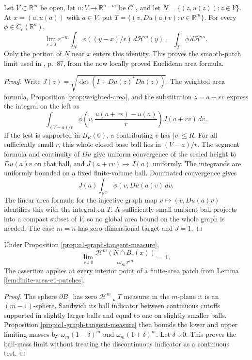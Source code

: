 \begin{proposition}\label{prop:c1-graph-tangent-measure}
Let $V\subset\mathbb R^m$ be open, let $u:V\to\mathbb R^{n-m}$ be $C^1$, and let $N=\{(z,u(z)):z\in V\}$. At $x=(a,u(a))$ with $a\in V$, put $T=\{(v,Du(a)v):v\in\mathbb R^m\}$. For every $\phi\in C_c(\mathbb R^n)$,
\[
 \lim_{r\downarrow0}r^{-m}\int_N\phi((y-x)/r)\,d\mathcal H^m(y)
 =\int_T\phi\,d\mathcal H^m.
\]
Only the portion of $N$ near $x$ enters this identity. This proves the smooth-patch limit used in \cite{Sim18}, p.~87, from the now locally proved Euclidean area formula.
\end{proposition}
\begin{proof}
Write $J(z)=\sqrt{\det(I+Du(z)^*Du(z))}$. The weighted area formula, Proposition \ref{prop:weighted-area}, and the substitution $z=a+rv$ express the integral on the left as
\[
 \int_{(V-a)/r}\phi\left(v,\frac{u(a+rv)-u(a)}r\right)J(a+rv)\,dv.
\]
If the test is supported in $B_R(0)$, a contributing $v$ has $|v|\leq R$. For all sufficiently small $r$, this whole closed base ball lies in $(V-a)/r$. The segment formula and continuity of $Du$ give uniform convergence of the scaled height to $Du(a)v$ on that ball, and $J(a+rv)\to J(a)$ uniformly. The integrands are uniformly bounded on a fixed finite-volume ball. Dominated convergence gives
\[
 J(a)\int_{\mathbb R^m}\phi(v,Du(a)v)\,dv.
\]
The linear area formula for the injective graph map $v\mapsto(v,Du(a)v)$ identifies this with the integral on $T$. A sufficiently small ambient ball projects into a compact subset of $V$, so no global area bound on the whole graph is needed. The case $m=n$ has zero-dimensional target and $J=1$.
\end{proof}

\begin{corollary}\label{cor:c1-patch-unit-density}
Under Proposition \ref{prop:c1-graph-tangent-measure},
\[
 \lim_{r\downarrow0}\frac{\mathcal H^m(N\cap B_r(x))}{\omega_m r^m}=1.
\]
The assertion applies at every interior point of a finite-area patch from Lemma \ref{lem:finite-area-c1-patches}.
\end{corollary}
\begin{proof}
The sphere $\partial B_1$ has zero $\mathcal H^m\llcorner T$ measure: in the $m$-plane it is an $(m-1)$-sphere. Sandwich its ball indicator between continuous cutoffs supported in slightly larger balls and equal to one on slightly smaller balls. Proposition \ref{prop:c1-graph-tangent-measure} then bounds the lower and upper limiting masses by $\omega_m(1-\delta)^m$ and $\omega_m(1+\delta)^m$. Let $\delta\downarrow0$. This proves the ball-mass limit without treating the discontinuous indicator as a continuous test.
\end{proof}

